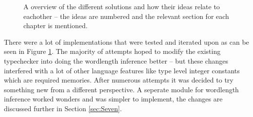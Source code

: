 \begin{figure}
  \caption{A overview of the different solutions and how their ideas relate to eachother -- the ideas are numbered and the relevant section for each chapter is mentioned.}
  \label{fig:taxonomy}
\end{figure}

There were a lot of implementations that were tested and iterated upon as can be seen in Figure \ref{fig:taxonomy}. The majority of attempts hoped to modify the existing typechecker into doing the wordlength inference better -- but these changes interfered with a lot of other language features like type level integer constants which are required memories. After numerous attempts it was decided to try something new from a different perspective. A seperate module for wordlength inference worked wonders and was simpler to implement, the changes are discussed further in Section \ref{sec:Seven}.


